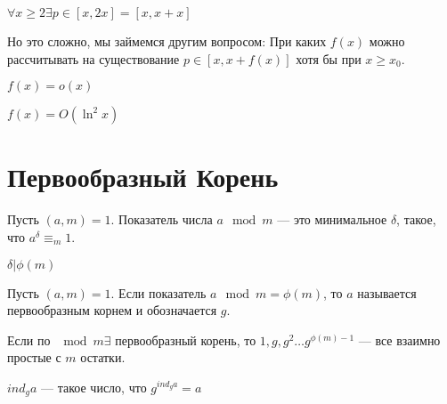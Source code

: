 \begin{proposition}
    \(\forall x \ge 2 \exists p \in [x, 2x] = [x, x + x]\)
\end{proposition}
Но это сложно, мы займемся другим вопросом: При каких \(f(x)\) можно рассчитывать на существование \(p \in [x, x + f(x)]\) хотя бы при \(x \ge x_0\).

\begin{proposition}
    \(f(x) = o(x)\)
\end{proposition}
\begin{proposition}[Гипотеза]
    \(f(x) = O(\ln^2x)\)
\end{proposition}

\section{Первообразный Корень}
\begin{definition}
    Пусть \((a, m) = 1\). Показатель числа \(a \mod m\) --- это минимальное \(\delta\), такое, что \(a^\delta \equiv_m 1\).
\end{definition}

\begin{proposition}
    \(\delta | \phi(m)\)
\end{proposition}
\begin{definition}
    Пусть \((a, m) = 1\). Если показатель \(a \mod m = \phi(m)\), то \(a\) называется первообразным корнем и обозначается \(g\).
\end{definition}
\begin{note}
    Если по \(\mod m \exists\) первообразный корень, то \(1, g, g^2 \dots g^{\phi(m) - 1}\) --- все взаимно простые с \(m\) остатки.
\end{note}

\begin{definition}
    \(ind_g a\) --- такое число, что \(g^{ind_ga} = a\)
\end{definition}